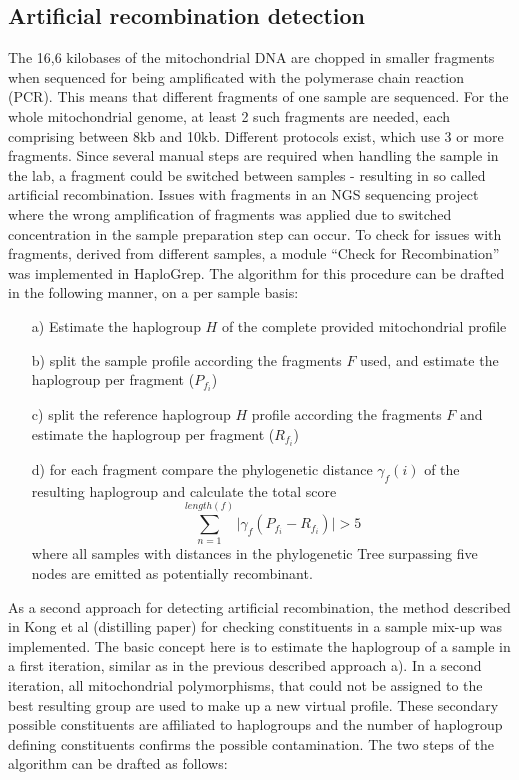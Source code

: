 \subsection{Artificial recombination detection}
The 16,6 kilobases of the mitochondrial DNA are chopped in smaller fragments when sequenced for being amplificated with the polymerase chain reaction (PCR). This means that different fragments of one sample are sequenced. For the whole mitochondrial genome, at least 2 such fragments are needed, each comprising between 8kb and 10kb. Different protocols exist, which use 3 or more fragments. Since several manual steps are required when handling the sample in the lab, a fragment could be switched between samples - resulting in so called artificial recombination. Issues with fragments in an NGS sequencing project where the wrong amplification of fragments was applied due to switched concentration in the sample preparation step can occur.
To check for issues with fragments, derived from different samples, a module "`Check for Recombination"' was implemented in HaploGrep. The algorithm for this procedure can be drafted in the following manner, on a per sample basis:
\begin{itemize}
	\item[a)] Estimate the haplogroup $H$ of the complete provided mitochondrial profile 
	\item[b)] split the sample profile according the fragments $F$ used, and estimate the haplogroup per fragment ($P_{f_i}$)
	\item[c)] split the reference haplogroup $H$ profile according the fragments $F$ and estimate the haplogroup per fragment ($R_{f_i}$)
	\item[d)] for each fragment compare the phylogenetic distance $\gamma_f(i)$ of the resulting haplogroup and calculate the total score $$\sum_{n=1}^{length(f)} |{\gamma_f(P_{f_i} - R_{f_i})| > 5}$$ where all samples with distances in the phylogenetic Tree surpassing five nodes are emitted as potentially recombinant.
\end{itemize}
As a second approach for detecting artificial recombination, the method described in Kong et al (distilling paper) for checking constituents in a sample mix-up was implemented. The basic concept here is to estimate the haplogroup of a sample in a first iteration, similar as in the previous described approach a). In a second iteration, all mitochondrial polymorphisms, that could not be assigned to the best resulting group are used to make up a new virtual profile. These secondary possible constituents are affiliated to haplogroups and the number of haplogroup defining constituents confirms the possible contamination. The two steps of the algorithm can be drafted as follows:
